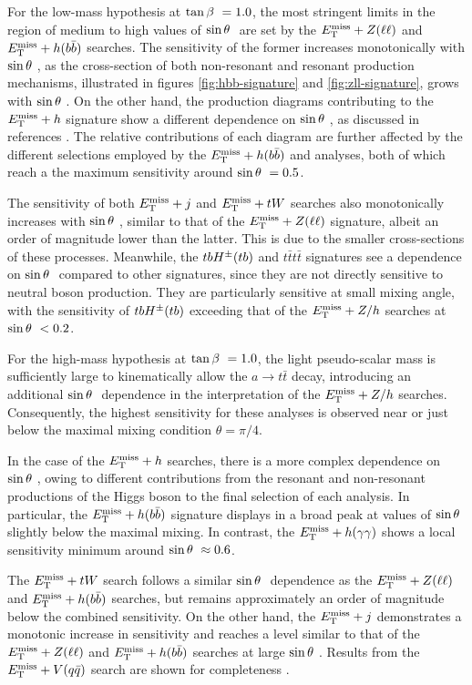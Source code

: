 For the low-mass hypothesis at $\tan\beta~=1.0$, the most stringent limits in the region of medium to high values of $\sin\theta~$ are set by the $E_{\mathrm{T}}^{\mathrm{miss}}+Z(\ell\ell)$ and $E_{\mathrm{T}}^{\mathrm{miss}}+h(b\bar{b})$ searches. The sensitivity of the former increases monotonically with $\sin\theta~$, as the cross-section of both non-resonant and resonant production mechanisms, illustrated in figures \ref{fig:hbb-signature} and \ref{fig:zll-signature}, grows with $\sin\theta~$. On the other hand, the production diagrams contributing to the $E_{\mathrm{T}}^{\mathrm{miss}}+h$ signature show a different dependence on $\sin\theta~$, as discussed in references \cite{Bauer:2017ota,EXOT-2017-32}. The relative contributions of each diagram are further affected by the different selections employed by the $E_{\mathrm{T}}^{\mathrm{miss}}+h(b\bar{b})$ and \monohgamgam analyses, both of which reach a the maximum sensitivity around $\sin\theta~=0.5$. 

The sensitivity of both $E_{\mathrm{T}}^{\mathrm{miss}}+j$ and $E_{\mathrm{T}}^{\mathrm{miss}}+tW$ searches also monotonically increases with $\sin\theta~$, similar to that of the $E_{\mathrm{T}}^{\mathrm{miss}}+Z(\ell\ell)$ signature, albeit an order of magnitude lower than the latter. This is due to the smaller cross-sections of these processes. Meanwhile, the $tbH^{\pm}(tb)$ and $t\bar{t}t\bar{t}$ signatures see a dependence on $\sin\theta~$ compared to other signatures, since they are not directly sensitive to neutral boson production. They are particularly sensitive at small mixing angle, with the sensitivity of $tbH^{\pm}(tb)$ exceeding that of the $E_{\mathrm{T}}^{\mathrm{miss}}+Z/h$ searches at $\sin\theta~ < 0.2$. 

For the high-mass hypothesis at $\tan\beta~=1.0$, the light pseudo-scalar mass is sufficiently large to kinematically allow the $a\rightarrow t\bar{t}$ decay, introducing an additional $\sin\theta~$ dependence in the interpretation of the $E_{\mathrm{T}}^{\mathrm{miss}}+Z/h$ searches. Consequently, the highest sensitivity for these analyses is observed near or just below the maximal mixing condition $\theta=\pi/4$. 

In the case of the $E_{\mathrm{T}}^{\mathrm{miss}} +h$ searches, there is a more complex dependence on $\sin\theta~$, owing to different contributions from the resonant and non-resonant productions of the Higgs boson to the final selection of each analysis. In particular, the $E_{\mathrm{T}}^{\mathrm{miss}} +h(b\bar{b})$ signature displays in a broad peak at values of $\sin\theta~$ slightly below the maximal mixing. In contrast, the $E_{\mathrm{T}}^{\mathrm{miss}} +h(\gamma\gamma)$ shows a local sensitivity minimum around $\sin\theta~\approx 0.6$. 

The $E_{\mathrm{T}}^{\mathrm{miss}} + tW$ search follows a similar $\sin\theta~$ dependence as the $E_{\mathrm{T}}^{\mathrm{miss}}+Z(\ell\ell)$ and $E_{\mathrm{T}}^{\mathrm{miss}}+h(b\bar{b})$ searches, but remains approximately an order of magnitude below the combined sensitivity. On the other hand, the $E_{\mathrm{T}}^{\mathrm{miss}}+j$ demonstrates a monotonic increase in sensitivity and reaches a level similar to that of the $E_{\mathrm{T}}^{\mathrm{miss}}+Z(\ell\ell)$ and $E_{\mathrm{T}}^{\mathrm{miss}}+h(b\bar{b})$ searches at large $\sin\theta~$. Results from the $E_{\mathrm{T}}^{\mathrm{miss}}+V(q\bar{q})$ search are shown for completeness \cite{EXOT-2017-32}.

